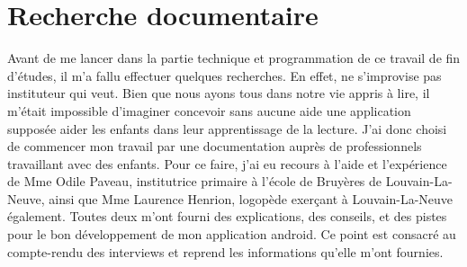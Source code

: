 \section{Recherche documentaire}
Avant de me lancer dans la partie technique et programmation de ce travail de fin d'études, il m'a fallu effectuer quelques recherches. En effet, ne s'improvise pas instituteur qui veut. Bien que nous ayons tous dans notre vie appris à lire, il m'était impossible d'imaginer concevoir sans aucune aide une application supposée aider les enfants dans leur apprentissage de la lecture. J'ai donc choisi de commencer mon travail par une documentation auprès de professionnels travaillant avec des enfants. Pour ce faire, j'ai eu recours à l'aide et l'expérience de Mme Odile Paveau, institutrice primaire à l'école de Bruyères de Louvain-La-Neuve, ainsi que Mme Laurence Henrion, logopède exerçant à Louvain-La-Neuve également. Toutes deux m'ont fourni des explications, des conseils, et des pistes pour le bon développement de mon application android. Ce point est consacré au compte-rendu des interviews et reprend les informations qu'elle m'ont fournies.